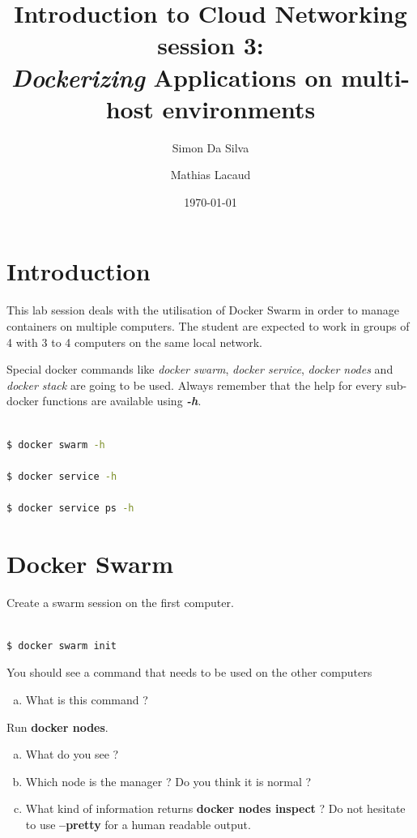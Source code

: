 \documentclass[a4paper,11pt]{exam}
\date{\today}
\title{Introduction to Cloud Networking session 3: \\
\textit{Dockerizing} Applications on multi-host environments}
\author{Simon Da Silva \and Mathias Lacaud}
\begin{document}
	
	

\maketitle

\section{Introduction}
This lab session deals with the utilisation of Docker Swarm in order 
to manage containers on multiple computers. The student are expected 
to work in groups of 4 with 3 to 4 computers on the same local network. 

Special docker commands like \textit{docker swarm}, \textit{docker service},
 \textit{docker nodes} and \textit{docker stack} are going to be used. 
 Always remember that the help for every sub-docker functions are available
  using \textit{\textbf{-h}}.

\begin{lstlisting}[frame=single,language={sh}]  % Start your code-block

$ docker swarm -h

$ docker service -h 

$ docker service ps -h

\end{lstlisting}

\section{Docker Swarm}

Create a swarm session on the first computer.

\begin{lstlisting}[frame=single,language={sh}]  % Start your code-block

$ docker swarm init

\end{lstlisting}

\begin{questions}
	\question You should see a command that needs to be used on the other computers
	\begin{enumerate}[(a)]
		\item What is this command ?
	\end{enumerate}
Run \textbf{docker nodes}.
	\begin{enumerate}[(b)]
		\item What do you see ?
		\item Which node is the manager ? Do you think it is normal ?
		\item What kind of information returns \textbf{docker nodes inspect} ? Do not hesitate to use \textbf{--pretty} for a human readable output.
	\end{enumerate}
\end{questions}
\end{document}
